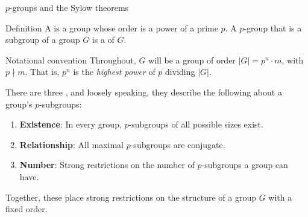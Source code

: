 \documentclass[8pt, handout]{beamer}
\newcommand{\Pause}{}      %
\begin{document}

\begin{frame}{$p$-groups and the Sylow theorems} 

  \begin{block}{Definition} 
    A  is a group whose order is a power of a prime
    $p$. A $p$-group that is a subgroup of a group $G$ is a
     of $G$.
  \end{block}

  \Pause\medskip

  \begin{exampleblock}{Notational convention}
    Throughout, $G$ will be a group of order $|G|=p^n\cdot m$, with
    $p\nmid m$. That is, $p^n$ is the \emph{highest power} of $p$
    dividing $|G|$.
  \end{exampleblock}

  \medskip\Pause

  There are three , and loosely speaking, they
  describe the following about a group's $p$-subgroups: \medskip

  \Pause

  \begin{enumerate}
  \item \textbf{Existence}: In every group, $p$-subgroups of all
    possible sizes exist. \Pause\vspace{1mm}
  \item \textbf{Relationship}: All maximal $p$-subgroups are
    conjugate. \Pause\vspace{1mm}
  \item \textbf{Number}: Strong restrictions on the number
    of $p$-subgroups a group can have.
  \end{enumerate}

  \medskip\Pause

  Together, these place strong restrictions on the structure of a
  group $G$ with a fixed order.

\end{frame}

\end{document}
